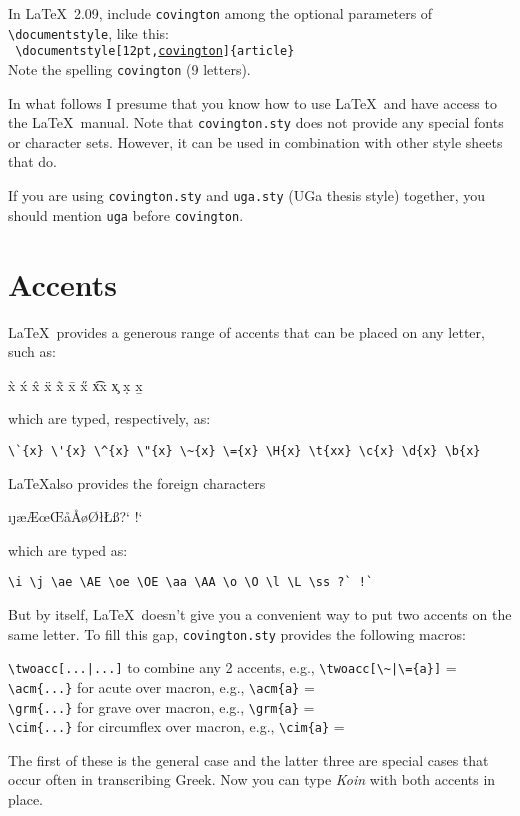 \documentclass{article}
\begin{document}
{\footnotesize
In \LaTeX\ 2.09,
include {\tt covington} among the optional parameters of 
\verb"\documentstyle", like this: \hfill\\
{\tt
\verb"\documentstyle[12pt,"\underline{covington}\verb"]{article}"
}\hfill\\
Note the spelling {\tt covington} (9 letters).
}

In what follows I presume that you know how to use \LaTeX\ and have 
access to the \LaTeX\ manual. Note that {\tt covington.sty} does not 
provide any special fonts or character sets.  However, it can be used in 
combination with other style sheets that do.

If you are using {\tt covington.sty} and {\tt uga.sty} (UGa thesis style) 
together, you should mention {\tt uga} before {\tt covington}.

 
\section{Accents}

\LaTeX\ provides a generous range of accents that can be placed on any
letter, such as:
\begin{flushleft}
\`{x} \'{x} \^{x} \"{x} \~{x} \={x} \H{x} \t{xx} \c{x} \d{x} \b{x}
\end{flushleft}
which are typed, respectively, as:
\begin{verbatim}
\`{x} \'{x} \^{x} \"{x} \~{x} \={x} \H{x} \t{xx} \c{x} \d{x} \b{x}
\end{verbatim}
\LaTeX also provides the foreign characters
\begin{flushleft}\obeyspaces
\i \j \ae \AE \oe \OE \aa \AA \o \O \l \L \ss ?` !`
\end{flushleft}
which are typed as:
\begin{verbatim}
\i \j \ae \AE \oe \OE \aa \AA \o \O \l \L \ss ?` !`
\end{verbatim}

But by itself, \LaTeX\ doesn't give you a convenient way to put two
accents on the same letter.  To fill this gap, {\tt covington.sty} provides
the following macros:
\begin{flushleft}
\verb,\twoacc[...|...], \quad to combine any 2 accents, e.g.,
               \verb.\twoacc[\~|\={a}]. = \twoacc[\~|\={a}]\\[6pt]
\verb,\acm{...}, \quad for acute over macron, e.g., \verb.\acm{a}. = \\
\verb,\grm{...}, \quad for grave over macron, e.g., \verb.\grm{a}. = \\
\verb,\cim{...}, \quad for circumflex over macron, e.g., \verb.\cim{a}. = 
\end{flushleft}
The first of these is the general case and the latter three are special
cases that occur often in transcribing Greek.  Now you can type
\emph{Koin} with both accents in place.
\end{document}

